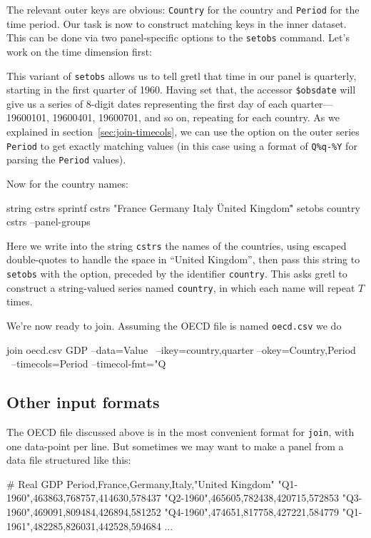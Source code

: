 The relevant outer keys are obvious: \texttt{Country} for the country
and \texttt{Period} for the time period. Our task is now to construct
matching keys in the inner dataset. This can be done via two
panel-specific options to the \texttt{setobs} command. Let's work on
the time dimension first:
This variant of \texttt{setobs} allows us to tell gretl that time in
our panel is quarterly, starting in the first quarter of 1960. Having
set that, the accessor \verb|$obsdate| will give us a series of
8-digit dates representing the first day of each quarter---19600101,
19600401, 19600701, and so on, repeating for each country. As we
explained in section~\ref{sec:join-timecols}, we can use the
 option on the outer series \texttt{Period} to get
exactly matching values (in this case using a format of \verb|Q%q-%Y|
for parsing the \texttt{Period} values).

Now for the country names:
\begin{code}
string cstrs
sprintf cstrs "France Germany Italy \"United Kingdom\""
setobs country cstrs --panel-groups
\end{code}
Here we write into the string \texttt{cstrs} the names of the
countries, using escaped double-quotes to handle the space in ``United
Kingdom'', then pass this string to \texttt{setobs} with the
 option, preceded by the identifier
\texttt{country}. This asks gretl to construct a string-valued series
named \texttt{country}, in which each name will repeat $T$ times.

We're now ready to join. Assuming the OECD file is named
\texttt{oecd.csv} we do
\begin{code}
join oecd.csv GDP --data=Value \
 --ikey=country,quarter --okey=Country,Period \
 --timecols=Period --timecol-fmt="Q%
\end{code}

\subsection{Other input formats}

The OECD file discussed above is in the most convenient format for
\texttt{join}, with one data-point per line. But sometimes we may want
to make a panel from a data file structured like this:
\begin{code}
# Real GDP
Period,France,Germany,Italy,"United Kingdom"
"Q1-1960",463863,768757,414630,578437
"Q2-1960",465605,782438,420715,572853
"Q3-1960",469091,809484,426894,581252
"Q4-1960",474651,817758,427221,584779
"Q1-1961",482285,826031,442528,594684
...
\end{code}


